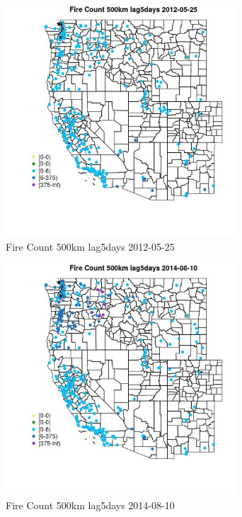 \begin{figure} 
\centering  
\includegraphics[width=0.77\textwidth]{Code_Outputs/Report_ML_input_PM25_Step4_part_e_de_duplicated_aves_compiled_2019-05-18wNAs_MapObsFire_Count_500km_lag5days2012-05-25.jpg} 
\caption{\label{fig:Report_ML_input_PM25_Step4_part_e_de_duplicated_aves_compiled_2019-05-18wNAsMapObsFire_Count_500km_lag5days2012-05-25}Fire Count 500km lag5days 2012-05-25} 
\end{figure} 
 

\begin{figure} 
\centering  
\includegraphics[width=0.77\textwidth]{Code_Outputs/Report_ML_input_PM25_Step4_part_e_de_duplicated_aves_compiled_2019-05-18wNAs_MapObsFire_Count_500km_lag5days2014-08-10.jpg} 
\caption{\label{fig:Report_ML_input_PM25_Step4_part_e_de_duplicated_aves_compiled_2019-05-18wNAsMapObsFire_Count_500km_lag5days2014-08-10}Fire Count 500km lag5days 2014-08-10} 
\end{figure} 
 

